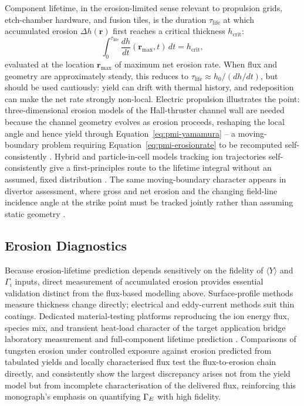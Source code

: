 Component lifetime, in the erosion-limited sense relevant to propulsion grids, etch-chamber hardware, and fusion tiles, is the duration $\tau_{\mathrm{life}}$ at which accumulated erosion $\Delta h(\mathbf{r})$ first reaches a critical thickness $h_{\mathrm{crit}}$:
\begin{equation}
\int_0^{\tau_{\mathrm{life}}} \frac{dh}{dt}(\mathbf{r}_{\mathrm{max}},t)\, dt = h_{\mathrm{crit}},
\label{eq:pmi-lifetime}
\end{equation}
evaluated at the location $\mathbf{r}_{\mathrm{max}}$ of maximum net erosion rate. When flux and geometry are approximately steady, this reduces to $\tau_{\mathrm{life}} \approx h_0/(dh/dt)$, but should be used cautiously: yield can drift with thermal history, and redeposition can make the net rate strongly non-local. Electric propulsion illustrates the point: three-dimensional erosion models of the Hall-thruster channel wall are needed because the channel geometry evolves as erosion proceeds, reshaping the local angle and hence yield through Equation~\eqref{eq:pmi-yamamura} -- a moving-boundary problem requiring Equation~\eqref{eq:pmi-erosionrate} to be recomputed self-consistently \cite{ref0454}. Hybrid and particle-in-cell models tracking ion trajectories self-consistently give a first-principles route to the lifetime integral without an assumed, fixed distribution \cite{ref0433}. The same moving-boundary character appears in divertor assessment, where gross and net erosion and the changing field-line incidence angle at the strike point must be tracked jointly rather than assuming static geometry \cite{ref0158}.

\subsection{Erosion Diagnostics}

Because erosion-lifetime prediction depends sensitively on the fidelity of $\langle Y \rangle$ and $\Gamma_i$ inputs, direct measurement of accumulated erosion provides essential validation distinct from the flux-based modelling above. Surface-profile methods measure thickness change directly; electrical and eddy-current methods suit thin coatings. Dedicated material-testing platforms reproducing the ion energy flux, species mix, and transient heat-load character of the target application bridge laboratory measurement and full-component lifetime prediction \cite{ref0588}. Comparisons of tungsten erosion under controlled exposure against erosion predicted from tabulated yields and locally characterised flux test the flux-to-erosion chain directly, and consistently show the largest discrepancy arises not from the yield model but from incomplete characterisation of the delivered flux, reinforcing this monograph's emphasis on quantifying $\Gamma_{E}$ with high fidelity.

